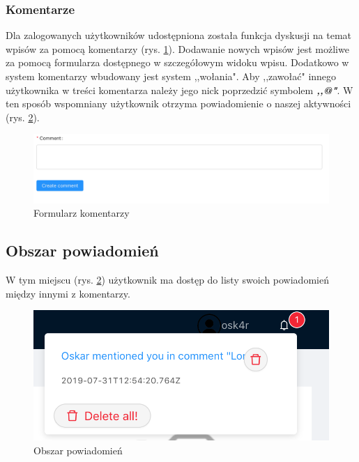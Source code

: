 \documentclass[declaration,shortabstract]{iithesis}
\begin{document}
\subsubsection{Komentarze}
Dla zalogowanych użytkowników udostępniona została funkcja dyskusji na temat wpisów za pomocą komentarzy (rys. \ref{fig:comment}). Dodawanie nowych wpisów jest możliwe za pomocą formularza dostępnego w szczegółowym widoku wpisu. Dodatkowo w system komentarzy wbudowany jest system ,,wołania". Aby ,,zawołać" innego użytkownika w treści komentarza należy jego nick poprzedzić symbolem \textbf{\textit{,,@"}}. W ten sposób wspomniany użytkownik otrzyma powiadomienie o naszej aktywności (rys. \ref{fig:notification}).

\begin{figure}
    \centering
    \includegraphics[width=\linewidth]{images/komentarz.png}
    \caption{Formularz komentarzy}
    \label{fig:comment}
\end{figure}

\subsection{Obszar powiadomień}
W tym miejscu (rys. \ref{fig:notification}) użytkownik ma dostęp do listy swoich powiadomień między innymi z komentarzy.
\begin{figure}
    \centering
    \includegraphics[width=\linewidth]{images/powiadomienia.png}
    \caption{Obszar powiadomień}
    \label{fig:notification}
\end{figure}
\end{document}
